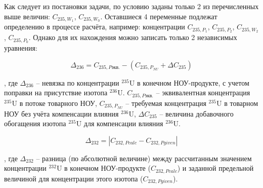 Как следует из постановки задачи, по условию заданы только 2 из перечисленных выше величин: $C_{235,{W_1}}$, $C_{235,{W_0}}$. Оставшиеся 4 переменные подлежат определению в процессе расчёта, например: концентрации $C_{235,{P_1}}$, $C_{235,{P_2}}$, $C_{235,{W_2}}$, $C_{235,{P_0}}$. Однако для их нахождения можно записать только 2 независимых уравнения:  

\begin{equation}
    \label{dis_235_6}
    \Delta_{236}=C_{235,P\textit{экв.}}-(C_{235,{P_{NU}}}+\Delta C_{235})
\end{equation}

, где $\Delta_{236}$ -- невязка по концентрации $^{235}$U в конечном НОУ-продукте, с учетом поправки на присутствие изотопа $^{236}$U. $C_{235,P\textit{экв.}}$ -- эквивалентная концентрация $^{235}$U в потоке товарного НОУ, $C_{235,{P_{NU}}}$ -- требуемая концентрация $^{235}$U в товарном НОУ без учёта компенсации влияния $^{236}$U, $\Delta C_{235}$ -- величина добавочного обогащения изотопа $^{235}$U для компенсации влияния $^{236}$U. 

\begin{equation}
\label{dis_232}
\Delta_{232}=\left|C_{232,P\textit{calc}}-C_{232,P\textit{given}}\right|
\end{equation}

, где $\Delta_{232}$ -- разница (по абсолютной величине) между рассчитанным значением концентрации $^{232}$U в конечном НОУ-продукте ($C_{232,P\textit{calc}}$) и заданной предельной величиной для концентрации этого изотопа ($C_{232,P\textit{given}}$).

